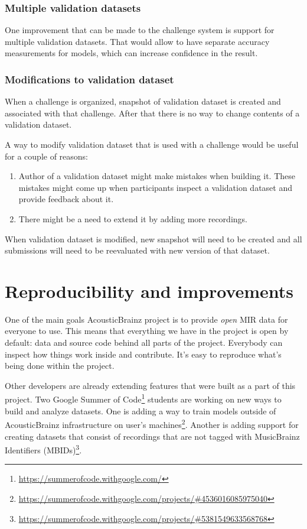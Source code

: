\subsubsection{Multiple validation datasets}

One improvement that can be made to the challenge system is support for multiple validation datasets. That would allow to have separate accuracy measurements for models, which can increase confidence in the result.

\subsubsection{Modifications to validation dataset}

When a challenge is organized, snapshot of validation dataset is created and associated with that challenge. After that there is no way to change contents of a validation dataset.

A way to modify validation dataset that is used with a challenge would be useful for a couple of reasons:
\begin{enumerate}
    \item Author of a validation dataset might make mistakes when building it. These mistakes might come up when participants inspect a validation dataset and provide feedback about it.
    \item There might be a need to extend it by adding more recordings.
\end{enumerate}

When validation dataset is modified, new snapshot will need to be created and all submissions will need to be reevaluated with new version of that dataset.


\section{Reproducibility and improvements}

One of the main goals AcousticBrainz project is to provide \emph{open} MIR data for everyone to use. This means that everything we have in the project is open by default: data and source code behind all parts of the project. Everybody can inspect how things work inside and contribute. It's easy to reproduce what's being done within the project.

Other developers are already extending features that were built as a part of this project. Two Google Summer of Code\footnote{\url{https://summerofcode.withgoogle.com/}} students are working on new ways to build and analyze datasets. One is adding a way to train models outside of AcousticBrainz infrastructure on user's machines\footnote{\url{https://summerofcode.withgoogle.com/projects/#4536016085975040}}. Another is adding support for creating datasets that consist of recordings that are not tagged with MusicBrainz Identifiers (MBIDs)\footnote{\url{https://summerofcode.withgoogle.com/projects/#5381549633568768}}.
